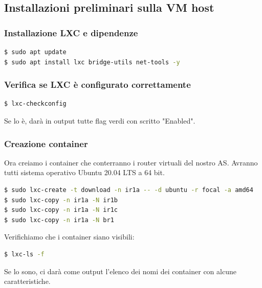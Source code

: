 \documentclass[12pt,a4paper,twoside]{book}
\begin{document}
\subsection{Installazioni preliminari sulla VM host}

\subsubsection{Installazione \ac{LXC} e dipendenze}
\begin{lstlisting}[language=bash]
$ sudo apt update
$ sudo apt install lxc bridge-utils net-tools -y
\end{lstlisting}
\subsubsection{Verifica se \ac{LXC} è configurato correttamente}
\begin{lstlisting}[language=bash]
$ lxc-checkconfig
\end{lstlisting}
Se lo è, darà in output tutte flag verdi con scritto "Enabled".
\subsubsection{Creazione container}
Ora creiamo i container che conterranno i router virtuali del nostro \ac{AS}. Avranno tutti sistema operativo Ubuntu 20.04 LTS a 64 bit.
\begin{lstlisting}[language=bash]
$ sudo lxc-create -t download -n ir1a -- -d ubuntu -r focal -a amd64
$ sudo lxc-copy -n ir1a -N ir1b
$ sudo lxc-copy -n ir1a -N ir1c
$ sudo lxc-copy -n ir1a -N br1
\end{lstlisting}
Verifichiamo che i container siano visibili:
\begin{lstlisting}[language=bash]
$ lxc-ls -f
\end{lstlisting}
Se lo sono, ci darà come output l'elenco dei nomi dei container con alcune caratteristiche.
\end{document}
